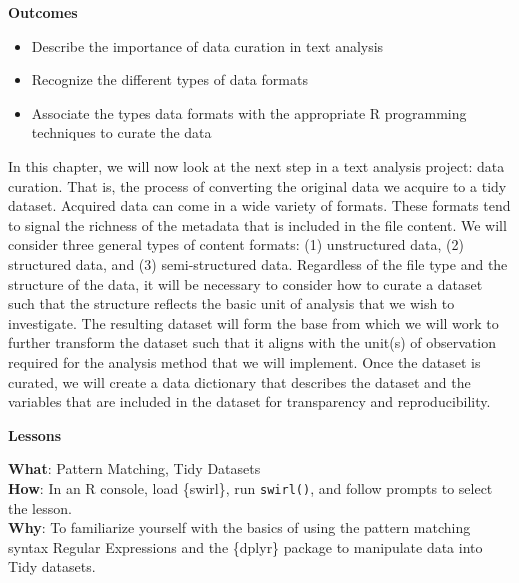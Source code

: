 \documentclass[
  letterpaper,
  krantz1]{latex/krantz-mod}
\providecommand{\tightlist}{%
  \setlength{\itemsep}{0pt}\setlength{\parskip}{0pt}}\usepackage{longtable,booktabs,array}
\theoremstyle{definition}
\theoremstyle{definition}
\theoremstyle{remark}
\begin{document}
\begin{tcolorbox}[enhanced jigsaw, toprule=.15mm, breakable, colback=white, arc=.35mm, left=2mm, colframe=quarto-callout-color-frame, opacityback=0, bottomrule=.15mm, rightrule=.15mm, leftrule=.75mm]

\textbf{ Outcomes}

\begin{itemize}
\tightlist
\item
  Describe the importance of data curation in text analysis
\item
  Recognize the different types of data formats
\item
  Associate the types data formats with the appropriate R programming
  techniques to curate the data
\end{itemize}

\end{tcolorbox}

In this chapter, we will now look at the next step in a text analysis
project: data curation. That is, the process of converting the original
data we acquire to a tidy dataset. Acquired data can come in a wide
variety of formats. These formats tend to signal the richness of the
metadata that is included in the file content. We will consider three
general types of content formats: (1) unstructured data, (2) structured
data, and (3) semi-structured data. Regardless of the file type and the
structure of the data, it will be necessary to consider how to curate a
dataset such that the structure reflects the basic unit of analysis that
we wish to investigate. The resulting dataset will form the base from
which we will work to further transform the dataset such that it aligns
with the unit(s) of observation required for the analysis method that we
will implement. Once the dataset is curated, we will create a data
dictionary that describes the dataset and the variables that are
included in the dataset for transparency and reproducibility.

\begin{tcolorbox}[enhanced jigsaw, toprule=.15mm, breakable, colback=white, arc=.35mm, left=2mm, colframe=quarto-callout-color-frame, opacityback=0, bottomrule=.15mm, rightrule=.15mm, leftrule=.75mm]

\textbf{ Lessons}

\textbf{What}: Pattern Matching, Tidy Datasets\\
\textbf{How}: In an R console, load \{swirl\}, run \texttt{swirl()}, and
follow prompts to select the lesson.\\
\textbf{Why}: To familiarize yourself with the basics of using the
pattern matching syntax Regular Expressions and the \{dplyr\} package to
manipulate data into Tidy datasets.

\end{tcolorbox}
\end{document}
